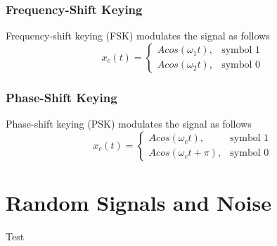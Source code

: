 \documentclass[]{article}
\begin{document}
\subsubsection{Frequency-Shift Keying}
Frequency-shift keying (FSK) modulates the signal as follows
\begin{equation} x_{c}(t)=\begin{cases}Acos(\omega_{1}t), & \text{symbol 1} \\
Acos(\omega_{2}t), & \text{symbol 0}
\end{cases} \end{equation}
\subsubsection{Phase-Shift Keying}
Phase-shift keying (PSK) modulates the signal as follows
\begin{equation} x_{c}(t)=\begin{cases}Acos(\omega_{c}t), & \text{symbol 1} \\
Acos(\omega_{c}t+\pi), & \text{symbol 0}
\end{cases} \end{equation}

\newpage
\section{Random Signals and Noise}
Test


\newpage

\end{document}
